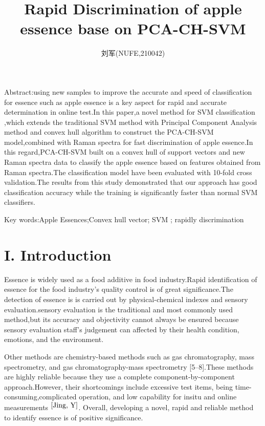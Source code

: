 \documentclass[a4paper]{article}
\author{刘军(NUFE,210042)}
\date{}
\title{Rapid Discrimination of apple essence base on PCA-CH-SVM  }
\begin{document}
\maketitle


Abstract:using new samples to improve the accurate and speed of classification for essence such as apple essence is a key aspect for rapid and accurate determination in online test.In this paper,a novel method for SVM classification ,which extends the traditional SVM method with Principal Component Analysis method and convex hull algorithm to construct the PCA-CH-SVM model,combined with Raman spectra for fast discrimination of apple essence.In this regard,PCA-CH-SVM built on a convex hull of support vectors and new Raman spectra data to classify the apple essence based on features obtained from Raman spectra.The classification model have been evaluated with 10-fold cross validation.The results from this study demonstrated that our approach has good classiﬁcation accuracy while the training is signiﬁcantly faster than normal SVM classiﬁers.



Key words:Apple Essences;Convex hull vector; SVM ; rapidly discrimination
\section{I. Introduction}
Essence is widely used as a food additive in food industry.Rapid identification of essence for the food industry's quality control is of great significance.The detection of essence is is carried out by physical-chemical indexes and sensory evaluation.sensory evaluation is the traditional and most commonly used method,but its accuracy and objectivity cannot always be ensured because sensory evaluation staff’s judgement can affected by their health condition, emotions, and the environment.

Other methods  are chemistry-based methods such as gas chromatography, mass spectrometry, and gas chromatography-mass spectrometry [5–8].These methods are highly reliable because they use a complete component-by-component approach.However, their shortcomings include excessive test items, being time-consuming,complicated operation, and low capability for insitu and online measurements $^{\cite{Jing, Y}}$. Overall, developing a novel, rapid and reliable method to identify  essence is of positive significance.
\end{document}
